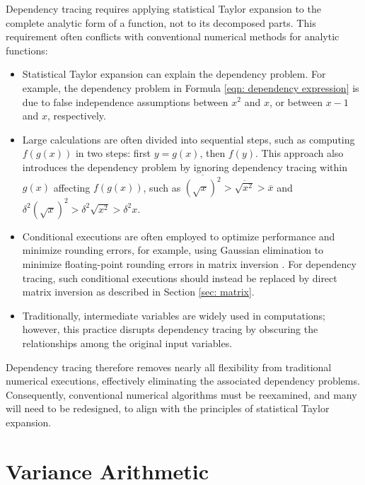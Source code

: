 \documentclass[twoside]{article}
\numberwithin{equation}{section}
\begin{document}
Dependency tracing requires applying statistical Taylor expansion to the complete analytic form of a function, not to its decomposed parts.
This requirement often conflicts with conventional numerical methods for analytic functions:
\begin{itemize}

\item 
Statistical Taylor expansion can explain the dependency problem. 
For example, the dependency problem in Formula \eqref{eqn: dependency expression} is due to false independence assumptions between $x^2$ and $x$, or between $x - 1$ and $x$, respectively.

\item
Large calculations are often divided into sequential steps, such as computing $f(g(x))$ in two steps: first $y = g(x)$, then $f(y)$.
This approach also introduces the dependency problem by ignoring dependency tracing within $g(x)$ affecting $f(g(x))$, such as $\overline{(\sqrt{x})^2} > \overline{\sqrt{x^2}} > \overline{x}$ and $\delta^2 (\sqrt{x})^2 > \delta^2 \sqrt{x^2} > \delta^2 x$.

\item
Conditional executions are often employed to optimize performance and minimize rounding errors, for example, using Gaussian elimination to minimize floating-point rounding errors in matrix inversion \cite{Linear_Algebra}.  
For dependency tracing, such conditional executions should instead be replaced by direct matrix inversion as described in Section \ref{sec: matrix}.

\item
Traditionally, intermediate variables are widely used in computations; however, this practice disrupts dependency tracing by obscuring the relationships among the original input variables.

\end{itemize}
Dependency tracing therefore removes nearly all flexibility from traditional numerical executions, effectively eliminating the associated dependency problems.
Consequently, conventional numerical algorithms must be reexamined, and many will need to be redesigned, to align with the principles of statistical Taylor expansion.








\section{Variance Arithmetic}
\label{sec: variance arithmetic}
\end{document}
